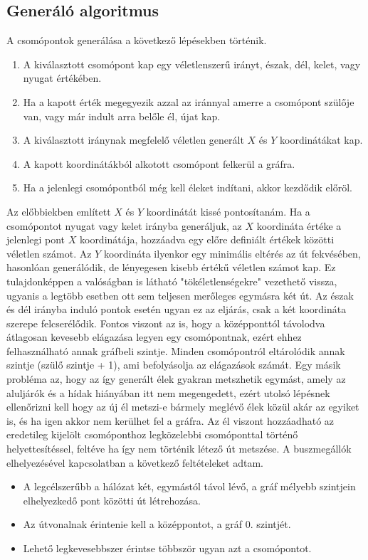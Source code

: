 \subsection{Generáló algoritmus}

A csomópontok generálása a következő lépésekben történik.
\begin{enumerate}
\item A kiválasztott csomópont kap egy véletlenszerű irányt, észak, dél, kelet, vagy nyugat értékében.
\item Ha a kapott érték megegyezik azzal az iránnyal amerre a csomópont szülője van, vagy már indult arra belőle él, újat kap.
\item A kiválasztott iránynak megfelelő véletlen generált $X$ és $Y$ koordinátákat kap.
\item A kapott koordinátákból alkotott csomópont felkerül a gráfra.
\item Ha a jelenlegi csomópontból még kell éleket indítani, akkor kezdődik előröl.
\end{enumerate}
Az előbbiekben említett $X$ és $Y$ koordinátát kissé pontosítanám. Ha a csomópontot nyugat vagy kelet irányba generáljuk, az $X$ koordináta értéke a jelenlegi pont $X$ koordinátája, hozzáadva egy
előre definiált értékek közötti véletlen számot. Az $Y$ koordináta ilyenkor egy minimális eltérés az út fekvésében, hasonlóan generálódik, de lényegesen kisebb értékű véletlen számot kap. Ez
tulajdonképpen a valóságban is látható "tökéletlenségekre" vezethető vissza, ugyanis a legtöbb esetben ott sem teljesen merőleges egymásra két út. Az észak és dél irányba induló pontok 
esetén ugyan ez az eljárás, csak a két koordináta szerepe felcserélődik.
Fontos viszont az is, hogy a középponttól távolodva átlagosan kevesebb elágazása legyen egy csomópontnak, ezért ehhez felhasználható annak gráfbeli szintje. Minden csomópontról eltárolódik 
annak szintje (szülő szintje + 1), ami befolyásolja az elágazások számát. Egy másik probléma az, hogy az így generált élek gyakran metszhetik egymást, amely az aluljárók és a hídak hiányában 
itt nem megengedett, ezért utolsó lépésnek ellenőrizni kell hogy az új él metszi-e bármely meglévő élek közül akár az egyiket is, és ha igen akkor nem kerülhet fel a gráfra. Az él viszont hozzáadható 
az eredetileg kijelölt csomóponthoz legközelebbi csomóponttal történő helyettesítéssel, feltéve ha így nem történik létező út metszése.
A buszmegállók elhelyezésével kapcsolatban a következő feltételeket
adtam.
\begin{itemize}
\item A legcélszerűbb a hálózat két, egymástól távol lévő, a gráf mélyebb szintjein elhelyezkedő pont közötti út létrehozása.
\item Az útvonalnak érintenie kell a középpontot, a gráf 0. szintjét.
\item Lehető legkevesebbszer érintse többször ugyan azt a csomópontot.
\end{itemize}
